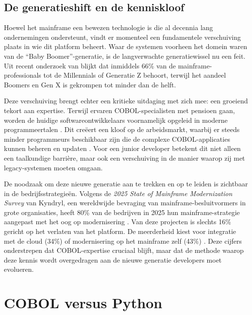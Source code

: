 \subsection{De generatieshift en de kenniskloof}

Hoewel het mainframe een bewezen technologie is die al decennia lang ondernemingen ondersteunt, vindt er momenteel een fundamentele verschuiving plaats in wie dit platform beheert. 
Waar de systemen voorheen het domein waren van de \enquote{Baby Boomer}-generatie, is de langverwachte generatiewissel nu een feit. 
Uit recent onderzoek van \textcite{BMC2025} blijkt dat inmiddels 66\% van de mainframe-professionals tot de Millennials of Generatie Z behoort, terwijl het aandeel Boomers en Gen X is gekrompen tot minder dan de helft.

Deze verschuiving brengt echter een kritieke uitdaging met zich mee: een groeiend tekort aan expertise. Terwijl ervaren COBOL-specialisten met pensioen gaan, worden de huidige softwareontwikkelaars voornamelijk opgeleid in moderne programmeertalen \autocite{IBM2025}. 
Dit creëert een kloof op de arbeidsmarkt, waarbij er steeds minder programmeurs beschikbaar zijn die de complexe COBOL-applicaties kunnen beheren en updaten \autocite{IBM2025}.
Voor een junior developer betekent dit niet alleen een taalkundige barrière, maar ook een verschuiving in de manier waarop zij met legacy-systemen moeten omgaan.

De noodzaak om deze nieuwe generatie aan te trekken en op te leiden is zichtbaar in de bedrijfsstrategieën. 
Volgens de \textit{2025 State of Mainframe Modernization Survey} van Kyndryl, een wereldwijde bevraging van mainframe-besluitvormers in grote organisaties, heeft 80\% van de bedrijven in 2025 hun mainframe-strategie aangepast met het oog op modernisering \autocite{Kyndryl2025}. 
Van deze projecten is slechts 16\% gericht op het verlaten van het platform. De meerderheid kiest voor integratie met de cloud (34\%) of modernisering op het mainframe zelf (43\%) \autocite{Kyndryl2025}.
Deze cijfers onderstrepen dat COBOL-expertise cruciaal blijft, maar dat de methode waarop deze kennis wordt overgedragen aan de nieuwe generatie developers moet evolueren.

\section{COBOL versus Python}
\label{sec:COBOL-versus-python}

